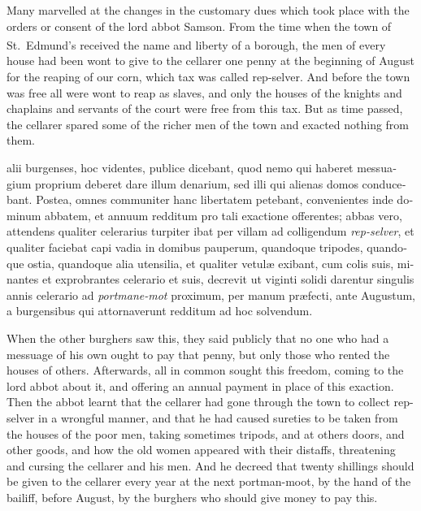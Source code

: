 \documentclass[10pt]{book}
\newcounter{engnote}
\newcommand{\engnotenum}{\textsuperscript{\arabic{engnote}\stepcounter{engnote}}}
\begin{document}
\begin{paracol}{2}
\begin{otherlanguage}{latin}
\end{otherlanguage}

\switchcolumn

Many marvelled at the changes in the customary dues which took place with the orders or consent of the lord abbot Samson. From the time when the town of St.\ Edmund's received the name and liberty of a borough,\engnotenum{} the men of every house had been wont to give to the cellarer one penny at the beginning of August for the reaping of our corn, which tax was called rep-selver. And before the town was free all were wont to reap as slaves, and only the houses of the knights and chaplains and servants of the court were free from this tax. But as time passed, the cellarer spared some of the richer men of the town and exacted nothing from them.

\switchcolumn*

\begin{otherlanguage}{latin}
alii burgenses, hoc videntes, publice dicebant, quod nemo qui haberet messuagium proprium deberet dare illum denarium, sed illi qui alienas domos conducebant. Postea, omnes communiter hanc libertatem petebant, convenientes inde dominum abbatem, et annuum redditum pro tali exactione offerentes; abbas vero, attendens qualiter celerarius turpiter ibat per villam ad colligendum \emph{rep-selver}, et qualiter faciebat capi vadia in domibus pauperum, quandoque tripodes, quandoque ostia, quandoque alia utensilia, et qualiter vetul\ae{} exibant, cum colis suis, minantes et exprobrantes celerario et suis, decrevit ut viginti solidi darentur singulis annis celerario ad \emph{portmane-mot} proximum, per manum pr\ae{}fecti, ante Augustum, a burgensibus qui attornaverunt redditum ad hoc solvendum.
\end{otherlanguage}

\switchcolumn

When the other burghers saw this, they said publicly that no one who had a messuage of his own ought to pay that penny, but only those who rented the houses of others. Afterwards, all in common sought this freedom, coming to the lord abbot about it, and offering an annual payment in place of this exaction. Then the abbot learnt that the cellarer had gone through the town to collect rep-selver in a wrongful manner, and that he had caused sureties to be taken from the houses of the poor men, taking sometimes tripods, and at others doors, and other goods, and how the old women appeared with their distaffs, threatening and cursing the cellarer and his men. And he decreed that twenty shillings should be given to the cellarer every year at the next portman-moot, by the hand of the bailiff, before August, by the burghers who should give money to pay this.


\end{paracol}
\end{document}
